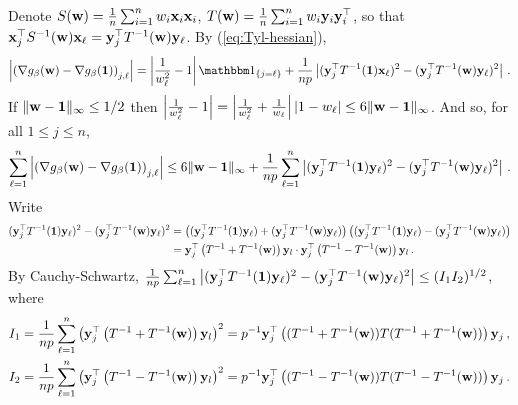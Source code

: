 \documentclass[times,sort&compress,3p]{elsarticle}
\begin{document}
Denote $S({\bf w})=\frac1n \sum_{i=1}^n w_i {\bf x}_i{\bf x}_i $, $T({\bf w})=\frac1n \sum_{i=1}^n w_i{\bf y}_i{\bf y}_i^\top$, so that ${\bf x}_j^\top S^{-1}({\bf w}){\bf x}_\ell = {\bf y}_j^\top T^{-1}({\bf w}){\bf y}_\ell$.
By (\ref{eq:Tyl-hessian}), 
\begin{align*}
    \left| \left(\nabla g_\beta(\w)-\nabla g_\beta(\oneVec)\right)_{j,\ell} \right| 
= \left| \frac{1}{w_\ell^2}-1\right|\indic{j=\ell} + \frac{1}{np}\left| (\y_j^\T T^{-1}(\oneVec)\x_\ell)^2-(\y_j^\T T^{-1}(\w)\y_\ell)^2\right| \,.
\end{align*}
If $\|{\bf w}-{\bf 1}\|_\infty\le 1/2$ then $\left| \frac{1}{w_\ell^2}-1\right| = \left| \frac{1}{w_\ell^2}+\frac{1}{w_\ell}\right| |1-w_\ell|\le 6\|{\bf w}-{\bf 1}\|_\infty$. And so, for all $1\le j \le n$,
\[
\sum_{\ell=1}^n \left| \left(\nabla g_\beta({\bf w})-\nabla g_\beta({\bf 1})\right)_{j,\ell} \right| \le 6\|{\bf w}-{\bf 1}\|_\infty + \frac{1}{np} \sum_{\ell=1}^n \left| ({\bf y}_j^\top T^{-1}({\bf 1}){\bf y}_\ell)^2-({\bf y}_j^\top T^{-1}({\bf w}){\bf y}_\ell)^2\right| \,.
\]
Write 
\begin{align*}
    ({\bf y}_j^\top T^{-1}({\bf 1}){\bf y}_\ell)^2-({\bf y}_j^\top T^{-1}({\bf w}){\bf y}_\ell)^2 
    &= \left(({\bf y}_j^\top T^{-1}({\bf 1}){\bf y}_\ell)+({\bf y}_j^\top T^{-1}({\bf w}){\bf y}_\ell)\right) \left( ({\bf y}_j^\top T^{-1}({\bf 1}){\bf y}_\ell)-({\bf y}_j^\top T^{-1}({\bf w}){\bf y}_\ell)\right) \\
    &= {\bf y}_j^\top \left( T^{-1}+T^{-1}({\bf w}) \right) {\bf y}_l \cdot {\bf y}_j^\top \left( T^{-1}-T^{-1}({\bf w}) \right) {\bf y}_l \,.
\end{align*}
By
Cauchy-Schwartz, $\frac{1}{np}\sum_{\ell=1}^n \left| ({\bf y}_j^\top T^{-1}({\bf 1}){\bf y}_\ell)^2-({\bf y}_j^\top T^{-1}({\bf w}){\bf y}_\ell)^2\right|\le  (I_1 I_2)^{1/2}$, where
\begin{equation*}
    \begin{split}
        &I_1 = \frac{1}{np}\sum_{\ell=1}^n \left( {\bf y}_j^\top \left( T^{-1}+T^{-1}({\bf w}) \right) {\bf y}_l \right)^2 = p^{-1}{\bf y}_j^\top \left( (T^{-1}+T^{-1}({\bf w}))T(T^{-1}+T^{-1}({\bf w})) \right) {\bf y}_j\,,\\
        &I_2 = \frac{1}{np}\sum_{\ell=1}^n \left( {\bf y}_j^\top \left( T^{-1}-T^{-1}({\bf w}) \right) {\bf y}_l \right)^2 = p^{-1}{\bf y}_j^\top \left( (T^{-1}-T^{-1}({\bf w}))T(T^{-1}-T^{-1}({\bf w})) \right) {\bf y}_j\,.
    \end{split}
\end{equation*}
\end{document}
